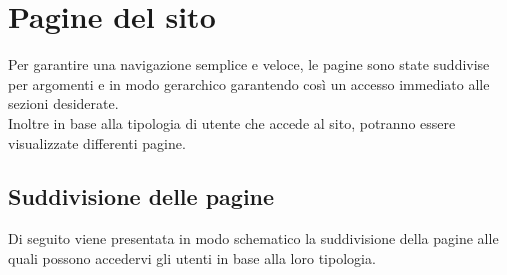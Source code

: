 \section{Pagine del sito}
Per garantire una navigazione semplice e veloce, le pagine sono state suddivise per argomenti e in modo gerarchico garantendo così un accesso immediato alle sezioni desiderate.\\
Inoltre in base alla tipologia di utente che accede al sito, potranno essere visualizzate differenti pagine.\\

\subsection{Suddivisione delle pagine}
Di seguito viene presentata in modo schematico la suddivisione della pagine alle quali possono accedervi gli utenti in base alla loro tipologia.

